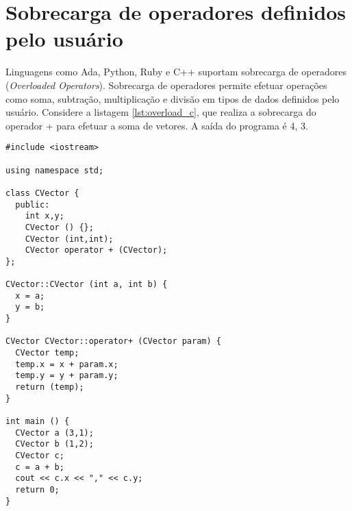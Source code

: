 \section{Sobrecarga de operadores definidos pelo usuário}
\label{sec:sobrecarga_operadores_definidos_pelo_usuario}
Linguagens como Ada, Python, Ruby e C++ suportam sobrecarga de operadores (\textit{Overloaded Operators}). Sobrecarga de operadores permite efetuar operações como soma, subtração, multiplicação e divisão em tipos de dados definidos pelo usuário. Considere a listagem \ref{lst:overload_c}, que realiza a sobrecarga do operador + para efetuar a soma de vetores. A saída do programa é 4, 3.

\begin{lstlisting}[caption={Código retirado de \cite{overload_c}}, label={lst:overload_c}]
#include <iostream>

using namespace std;

class CVector {
  public:
    int x,y;
    CVector () {};
    CVector (int,int);
    CVector operator + (CVector);
};

CVector::CVector (int a, int b) {
  x = a;
  y = b;
}

CVector CVector::operator+ (CVector param) {
  CVector temp;
  temp.x = x + param.x;
  temp.y = y + param.y;
  return (temp);
}

int main () {
  CVector a (3,1);
  CVector b (1,2);
  CVector c;
  c = a + b;
  cout << c.x << "," << c.y;
  return 0;
}
\end{lstlisting}